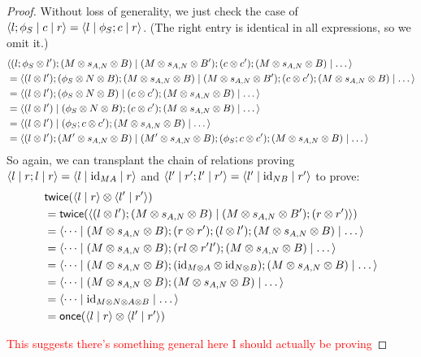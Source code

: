 \documentclass[11pt,letterpaper]{article}
\theoremstyle{plain}
\theoremstyle{definition}
\newcommand{\id}{\mathrm{id}}
\newcommand{\rep}[2]{{\ensuremath \left\langle #1 \mid #2 \right\rangle}}
\newcommand{\repthree}[3]{{\ensuremath \langle #1 \mid #2 \mid #3 \rangle}}
\newcommand{\once}{\mathsf{once}}
\newcommand{\twice}{\mathsf{twice}}
\newcommand{\todo}[1]{\textcolor{red}{\small #1}}
\begin{document}
\begin{proof}
Without loss of generality, we just check the case of $\repthree{l;\phi_S}{c}{r} = \repthree{l}{\phi_S ; c}{r}$. (The right entry is identical in all expressions, so we omit it.)
\begin{align*}
&\repthree{(l;\phi_S \otimes l');(M \otimes s_{A,N} \otimes B)}{(M \otimes s_{A,N} \otimes B');(c \otimes c');(M \otimes s_{A,N} \otimes B)}{\dots} \\
&= \repthree{(l \otimes l');(\phi_S \otimes N \otimes B);(M \otimes s_{A,N} \otimes B)}{(M \otimes s_{A,N} \otimes B');(c \otimes c');(M \otimes s_{A,N} \otimes B)}{\dots} \\
&= \repthree{(l \otimes l');(\phi_S \otimes N \otimes B)}{(c \otimes c');(M \otimes s_{A,N} \otimes B)}{\dots} \\
&= \repthree{(l \otimes l')}{(\phi_S \otimes N \otimes B);(c \otimes c');(M \otimes s_{A,N} \otimes B)}{\dots} \\
&= \repthree{(l \otimes l')}{(\phi_S;c \otimes c');(M \otimes s_{A,N} \otimes B)}{\dots} \\
&= \repthree{(l \otimes l');(M' \otimes s_{A,N} \otimes B)}{(M' \otimes s_{A,N} \otimes B);(\phi_S;c \otimes c');(M \otimes s_{A,N} \otimes B)}{\dots}
\end{align*}
So again, we can transplant the chain of relations proving $\repthree{l}{r;l}{r} = \repthree{l}{\id_{MA}}{r}$ and $\repthree{l'}{r';l'}{r'} = \repthree{l'}{\id_{NB}}{r'}$ to prove:
\begin{align*}
&\twice(\rep{l}{r} \otimes \rep{l'}{r'}) \\
&= \twice(\rep{(l \otimes l');(M \otimes s_{A,N} \otimes B)}{(M \otimes s_{A,N} \otimes B');(r \otimes r')}) \\
&=\repthree{\dots}{(M \otimes s_{A,N} \otimes B);(r \otimes r');(l \otimes l');(M \otimes s_{A,N} \otimes B)}{\dots} \\
&= \repthree{\dots}{(M \otimes s_{A,N} \otimes B);(rl \otimes r'l');(M \otimes s_{A,N} \otimes B)}{\dots} \\
&= \repthree{\dots}{(M \otimes s_{A,N} \otimes B);(\id_{M \otimes A} \otimes \id_{N \otimes B});(M \otimes s_{A,N} \otimes B)}{\dots} \\
&= \repthree{\dots}{(M \otimes s_{A,N} \otimes B);(M \otimes s_{A,N} \otimes B)}{\dots} \\
&= \repthree{\dots}{\id_{M \otimes N \otimes A \otimes B}}{\dots} \\
&= \once(\rep{l}{r} \otimes \rep{l'}{r'})
\end{align*}

\todo{This suggests there's something general here I should actually be proving}
\end{proof}
\end{document}
